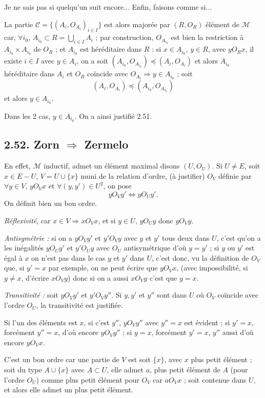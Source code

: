 Je ne sais pas si quelqu'un suit encore... Enfin, faisons comme si...

La partie $\mathcal C=\{(A_i,O_{A_i})_{i\in I}\}$ est alors majorée par $(R,O_R)$ élément de $\mathcal M$ car, $\forall i_0$, $A_{i_0}\subset R=\bigcup_{i\in I}A_i$ ; par construction, $O_{A_{i_0}}$ est bien la restriction à $A_{i_0}\times A_{i_0}$ de $O_R$ ; et $A_{i_0}$ est héréditaire dans $R$ : si $x\in A_{i_0}$, $y\in R$, avec $yO_Rx$, il existe $i\in I$ avec $y\in A_i$, on a soit $(A_{i_0},O_{A_{i_0}})\preccurlyeq(A_i,O_{A_i})$ et alors $A_{i_0}$ héréditaire dans $A_i$ et $O_R$ coïncide avec $O_{A_i}\Rightarrow y\in A_{i_0}$ ; soit
\[
(A_i,O_{A_i})\preccurlyeq(A_{i_0},O_{A_{i_0}})
\]
et alors $y\in A_{i_0}$.

Dans les 2 cas, $y\in A_{i_0}$. On a ainsi justifié 2.51. \bookend

\subsection*{2.52. Zorn $\Rightarrow$ Zermelo}

En effet, $\mathcal M$ inductif, admet un élément maximal disons $(U,O_U)$. Si $U\ne E$, soit $x\in E-U$, $V=U\cup\{x\}$ muni de la relation d'ordre, (à justifier) $O_V$ définie par $\forall y\in V$, $yO_Vx$ et $\forall(y,y')\in U^2$, on pose
\[
yO_Vy'\Leftrightarrow yO_Uy'.
\]
On définit bien un bon ordre.

\emph{Réflexivité}, car $x\in V\Rightarrow xO_Vx$, et si $y\in U$, $yO_Uy$ donc $yO_Vy$.

\emph{Antisymétrie :} si on a $yO_Vy'$ et $y'O_Vy$ avec $y$ et $y'$ tous deux dans $U$, c'est qu'on a les inégalités $yO_Uy'$ et $y'O_Uy$ avec $O_U$ antisymétrique d'où $y=y'$ ; si $y$ ou $y'$ est égal à $x$ on n'est pas dans le cas $y$ et $y'$ dans $U$, c'est donc, vu la définition de $O_V$ que, si $y'=x$ par exemple, on ne peut écrire que $yO_Vx$, (avec impossibilité, si $y\ne x$, d'écrire $xO_Vy$) donc si on a aussi $xO_Vy$ c'est que $y=x$.

\emph{Transitivité :} soit $yO_Vy'$ et $y'O_Vy''$. Si $y,y'$ et $y''$ sont dans $U$ où $O_V$ coïncide avec l'ordre $O_U$, la transitivité est justifiée.

Si l'un des éléments est $x$, si c'est $y''$, $yO_Vy''$ avec $y''=x$ est évident ; si $y'=x$, forcément $y''=x$, d'où encore $yO_Vy''$ ; si $y=x$, forcément $y'=x$, $y''$ aussi d'où encore $yO_Vx$.

C'est un bon ordre car une partie de $V$ est soit $\{x\}$, avec $x$ plus petit élément ; soit du type $A\cup\{x\}$ avec $A\subset U$, elle admet $a$, plus petit élément de $A$ (pour l'ordre $O_U$) comme plus petit élément pour $O_V$ car $aO_Vx$ ; soit contenue dans $U$, et alors elle admet un plus petit élément.

